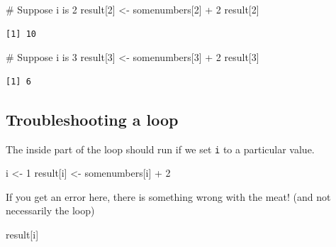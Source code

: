 \documentclass[
  letterpaper,
  DIV=11,
  numbers=noendperiod]{scrreprt}
\newenvironment{Shaded}{\begin{snugshade}}{\end{snugshade}}
\newcommand{\CommentTok}[1]{\textcolor[rgb]{0.37,0.37,0.37}{#1}}
\newcommand{\DecValTok}[1]{\textcolor[rgb]{0.68,0.00,0.00}{#1}}
\newcommand{\NormalTok}[1]{\textcolor[rgb]{0.00,0.23,0.31}{#1}}
\newcommand{\OtherTok}[1]{\textcolor[rgb]{0.00,0.23,0.31}{#1}}
\newcommand{\SpecialCharTok}[1]{\textcolor[rgb]{0.37,0.37,0.37}{#1}}
\begin{document}
\begin{Shaded}
\begin{Highlighting}[]
\CommentTok{\# Suppose i is 2}
\NormalTok{result[}\DecValTok{2}\NormalTok{] }\OtherTok{\textless{}{-}}\NormalTok{ somenumbers[}\DecValTok{2}\NormalTok{] }\SpecialCharTok{+} \DecValTok{2}
\NormalTok{result[}\DecValTok{2}\NormalTok{]}
\end{Highlighting}
\end{Shaded}

\begin{verbatim}
[1] 10
\end{verbatim}

\begin{Shaded}
\begin{Highlighting}[]
\CommentTok{\# Suppose i is 3}
\NormalTok{result[}\DecValTok{3}\NormalTok{] }\OtherTok{\textless{}{-}}\NormalTok{ somenumbers[}\DecValTok{3}\NormalTok{] }\SpecialCharTok{+} \DecValTok{2}
\NormalTok{result[}\DecValTok{3}\NormalTok{]}
\end{Highlighting}
\end{Shaded}

\begin{verbatim}
[1] 6
\end{verbatim}

\hypertarget{troubleshooting-a-loop}{%
\subsection{Troubleshooting a loop}\label{troubleshooting-a-loop}}

The inside part of the loop should run if we set \texttt{i} to a
particular value.

\begin{Shaded}
\begin{Highlighting}[]
\NormalTok{i }\OtherTok{\textless{}{-}} \DecValTok{1}
\NormalTok{result[i] }\OtherTok{\textless{}{-}}\NormalTok{ somenumbers[i] }\SpecialCharTok{+} \DecValTok{2}
\end{Highlighting}
\end{Shaded}

If you get an error here, there is something wrong with the meat! (and
not necessarily the loop)

\begin{Shaded}
\begin{Highlighting}[]
\NormalTok{result[i]}
\end{Highlighting}
\end{Shaded}
\end{document}
